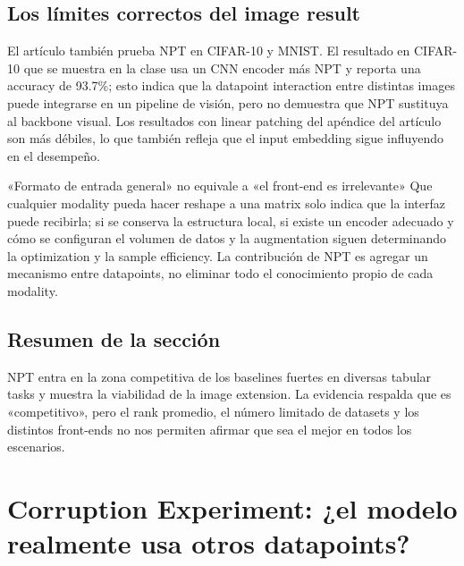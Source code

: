 \documentclass[a4paper]{article}
\begin{document}

\subsection{Los límites correctos del image result}

El artículo también prueba NPT en CIFAR-10 y MNIST. El resultado en CIFAR-10 que se muestra en la clase usa un CNN encoder más NPT y reporta una accuracy de 93.7\%; esto indica que la datapoint interaction entre distintas images puede integrarse en un pipeline de visión, pero no demuestra que NPT sustituya al backbone visual. Los resultados con linear patching del apéndice del artículo son más débiles, lo que también refleja que el input embedding sigue influyendo en el desempeño.

\begin{warningbox}{«Formato de entrada general» no equivale a «el front-end es irrelevante»}
Que cualquier modality pueda hacer reshape a una matrix solo indica que la interfaz puede recibirla; si se conserva la estructura local, si existe un encoder adecuado y cómo se configuran el volumen de datos y la augmentation siguen determinando la optimization y la sample efficiency. La contribución de NPT es agregar un mecanismo entre datapoints, no eliminar todo el conocimiento propio de cada modality.
\end{warningbox}

\subsection{Resumen de la sección}

NPT entra en la zona competitiva de los baselines fuertes en diversas tabular tasks y muestra la viabilidad de la image extension. La evidencia respalda que es «competitivo», pero el rank promedio, el número limitado de datasets y los distintos front-ends no nos permiten afirmar que sea el mejor en todos los escenarios.
\section{Corruption Experiment: ¿el modelo realmente usa otros datapoints?}
\end{document}
